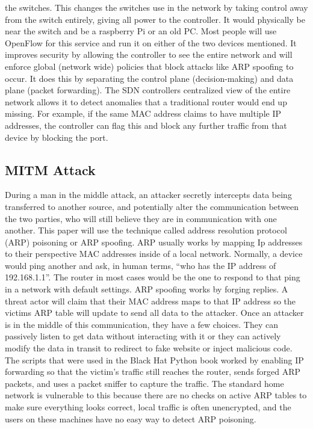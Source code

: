 \documentclass[12pt]{article}
\begin{document}
the switches. This changes the switches use in the network by taking control away from the switch entirely, 
giving all power to the controller. It would physically be near the switch and be a raspberry Pi or an old 
PC. Most people will use OpenFlow for this service and run it on either of the two devices mentioned. It 
improves security by allowing the controller to see the entire network and will enforce global 
(network wide) policies that block attacks like ARP spoofing to occur. It does this by separating the 
control plane (decision-making) and data plane (packet forwarding). The SDN controllers centralized view 
of the entire network allows it to detect anomalies that a traditional router would end up missing. For 
example, if the same MAC address claims to have multiple IP addresses, the controller can flag this and 
block any further traffic from that device by blocking the port. 


\subsection{MITM Attack}
During a man in the middle attack, an attacker secretly intercepts data being transferred to another 
source, and potentially alter the communication between the two parties, who will still believe they 
are in communication with one another. This paper will use the technique called address resolution protocol 
(ARP) poisoning or ARP spoofing. ARP usually works by mapping Ip addresses to their perspective MAC addresses 
inside of a local network. Normally, a device would ping another and ask, in human terms, “who has the IP 
address of 192.168.1.1”. The router in most cases would be the one to respond to that ping in a network 
with default settings. ARP spoofing works by forging replies. A threat actor will claim that their MAC 
address maps to that IP address so the victims ARP table will update to send all data to the attacker. 
Once an attacker is in the middle of this communication, they have a few choices. They can passively listen 
to get data without interacting with it or they can actively modify the data in transit to redirect to fake 
website or inject malicious code.
The scripts that were used in the Black Hat Python book worked by enabling IP forwarding so that the victim's 
traffic still reaches the router, sends forged ARP packets, and uses a packet sniffer to capture the traffic.
The standard home network is vulnerable to this because there are no checks on active ARP tables to make sure 
everything looks correct, local traffic is often unencrypted, and the users on these machines have no easy way 
to detect ARP poisoning. 
\end{document}
